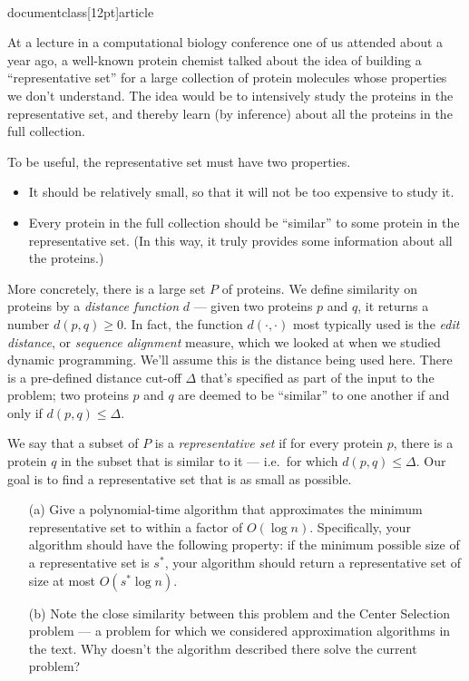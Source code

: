 \\documentclass[12pt]{article}
\begin{document}
\begin{enumerate}
At a lecture in a computational biology conference
one of us attended about a year ago, a well-known protein chemist
talked about the idea of building a ``representative set'' for
a large collection of protein molecules whose properties we
don't understand.
The idea would be to intensively study the proteins in
the representative set, and thereby learn (by inference) about all the proteins
in the full collection.

To be useful, the representative set must have two properties.
\begin{itemize}
\item It should be relatively small, so
that it will not be too expensive to study it.
\item Every protein in the full collection
should be ``similar'' to some protein in the representative set.
(In this way, it truly provides some information about
all the proteins.)
\end{itemize}

More concretely, there is a large set $P$ of proteins.
We define similarity on proteins by a
{\em distance function} $d$ --- given two proteins
$p$ and $q$, it returns a number $d(p,q) \geq 0$.
In fact, the function $d(\cdot,\cdot)$ most typically
used is the {\em edit distance}, or {\em sequence alignment} measure,
which we looked at when we studied dynamic programming.
We'll assume this is the distance being used here.
There is a pre-defined distance cut-off $\Delta$ that's
specified as part of the input to the problem;
two proteins $p$ and $q$
are deemed to be ``similar'' to one another if and only if
$d(p,q) \leq \Delta$.

We say that a subset of $P$ is a {\em representative set}
if for every protein $p$, there is a protein $q$
in the subset that is similar to it ---
i.e.~for which $d(p,q) \leq \Delta$.
Our goal is to find a representative set that is as small
as possible.

\begin{itemize}
\item[(a)]
Give a polynomial-time algorithm that approximates
the minimum representative set to within a factor of $O(\log n)$.
Specifically, your algorithm should have the
following property:
if the minimum possible size of a representative
set is $s^*$, your algorithm should return a
representative set of size at most $O(s^* \log n)$.
\item[(b)] Note the close similarity between this problem
and the Center Selection problem --- a problem for which we considered
approximation algorithms in the text.
Why doesn't the algorithm described there solve the current problem?
\end{itemize}






\end{enumerate}
\end{document}

